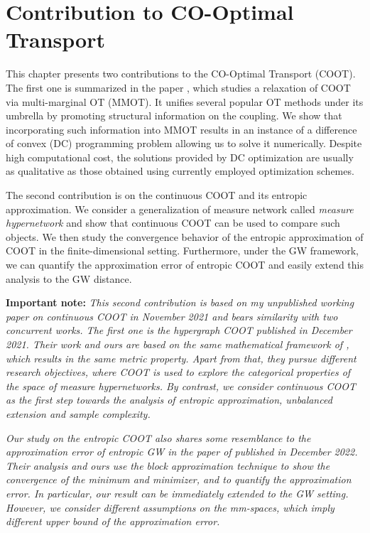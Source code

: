 
\chapter[Contribution to CO-Optimal Transport]{Contribution to CO-Optimal Transport}

\localtableofcontents*


This chapter presents two contributions to the CO-Optimal Transport (COOT).
The first one is summarized in the paper \citep{Tran21},
which studies a relaxation of COOT via multi-marginal OT (MMOT).
It unifies several popular OT methods under its umbrella by promoting structural information
on the coupling. We show that incorporating such information into MMOT results in an
instance of a difference of convex (DC) programming problem allowing us to solve it numerically.
Despite high computational cost, the solutions provided by DC optimization are usually
as qualitative as those obtained using currently employed optimization schemes.

The second contribution is on the continuous COOT and its entropic approximation.
We consider a generalization of measure network called \textit{measure hypernetwork}
and show that continuous COOT can be used to compare such objects.
We then study the convergence behavior of the entropic approximation of COOT in the finite-dimensional
setting. Furthermore, under the GW framework, we can quantify the approximation error of
entropic COOT and easily extend this analysis to the GW distance.

\textbf{Important note:} \textit{This second contribution is based on my unpublished working paper
on continuous COOT in November 2021 and bears similarity with two concurrent works.
The first one is the hypergraph COOT \citep{Chowdhury21b} published in December 2021.
Their work and ours are based on the same mathematical framework of \citep{Chowdhury19},
which results in the same metric property. Apart from that, they pursue different research objectives,
where COOT is used to explore the categorical properties of the space of measure hypernetworks.
By contrast, we consider continuous COOT as the first step towards the analysis of
entropic approximation, unbalanced extension and sample complexity.}

\textit{Our study on the entropic COOT also shares some resemblance to the approximation error of
entropic GW in the paper of \citep{Zhang23} published in December 2022.
Their analysis and ours use the block approximation technique \citep{Carlier17}
to show the convergence of the minimum and minimizer, and to quantify the approximation error.
In particular, our result can be immediately extended to the GW setting. However,
we consider different assumptions on the mm-spaces,
which imply different upper bound of the approximation error.}

